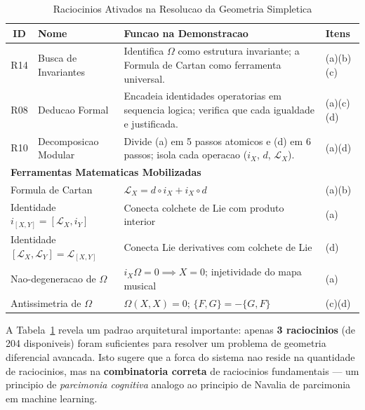 \documentclass[5p]{elsarticle}
\begin{document}
\begin{table}[H]
  \centering
  \caption{Raciocinios Ativados na Resolucao da Geometria Simpletica}
  \label{tab:simpletica_agents}
  \footnotesize
  \begin{tabular}{clp{5cm}l}
    \toprule
    \textbf{ID} & \textbf{Nome} & \textbf{Funcao na Demonstracao} & \textbf{Itens}\\
    \midrule
    R14 & Busca de Invariantes & Identifica $\Omega$ como estrutura invariante;
                                 a Formula de Cartan como ferramenta universal. & (a)(b)(c)\\
    R08 & Deducao Formal & Encadeia identidades operatorias em sequencia logica;
                            verifica que cada igualdade e justificada. & (a)(c)(d)\\
    R10 & Decomposicao Modular & Divide (a) em 5 passos atomicos e (d) em 6 passos;
                                 isola cada operacao ($i_X$, $d$, $\mathcal{L}_X$). & (a)(d)\\
    \midrule
    \multicolumn{4}{l}{\textbf{Ferramentas Matematicas Mobilizadas}}\\
    \midrule
    \multicolumn{2}{l}{Formula de Cartan} & $\mathcal{L}_X = d \circ i_X + i_X \circ d$ & (a)(b)\\
    \multicolumn{2}{l}{Identidade $i_{[X,Y]} = [\mathcal{L}_X, i_Y]$} & Conecta colchete de Lie com produto interior & (a)\\
    \multicolumn{2}{l}{Identidade $[\mathcal{L}_X, \mathcal{L}_Y] = \mathcal{L}_{[X,Y]}$} & Conecta Lie derivatives com colchete de Lie & (d)\\
    \multicolumn{2}{l}{Nao-degeneracao de $\Omega$} & $i_X\Omega = 0 \implies X = 0$; injetividade do mapa musical & (a)\\
    \multicolumn{2}{l}{Antissimetria de $\Omega$} & $\Omega(X,X) = 0$; $\{F,G\} = -\{G,F\}$ & (c)(d)\\
    \bottomrule
  \end{tabular}
\end{table}

A Tabela~\ref{tab:simpletica_agents} revela um padrao arquitetural
importante: apenas \textbf{3 raciocinios} (de 204 disponiveis) foram
suficientes para resolver um problema de geometria diferencial avancada.
Isto sugere que a forca do sistema nao reside na quantidade de
raciocinios, mas na \textbf{combinatoria correta} de raciocinios
fundamentais --- um principio de \textit{parcimonia cognitiva} analogo
ao principio de Navalia de parcimonia em machine learning.
\end{document}
